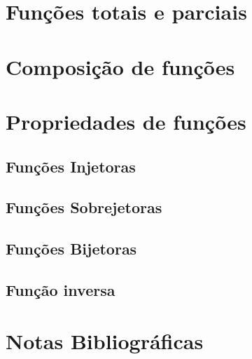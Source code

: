 \section{Funções totais e parciais}

\section{Composição de funções}

\section{Propriedades de funções}

\subsection{Funções Injetoras}

\subsection{Funções Sobrejetoras}

\subsection{Funções Bijetoras}

\subsection{Função inversa}


\section{Notas Bibliográficas}